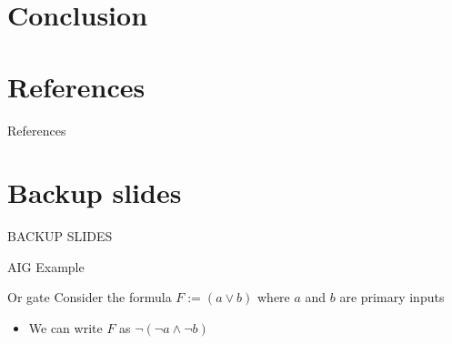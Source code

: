 \section{Conclusion}



\section*{References}
\begin{frame}[allowframebreaks]{References}


\end{frame}


\section*{Backup slides}
\begin{frame}[c]
  \LARGE{BACKUP SLIDES}
\end{frame}

\begin{frame}{AIG Example}
 \begin{exampleblock}{Or gate}
  Consider the formula $F := (a \lor b)$ where $a$ and $b$ are primary inputs
 \end{exampleblock}
 \begin{itemize}
   \item We can write $F$ as $\lnot ( \lnot a \land \lnot b )$
 \end{itemize}
 \begin{center}
 	\resizebox{0.2\textwidth}{!}{
		 
 	}
 \end{center}
\end{frame}

